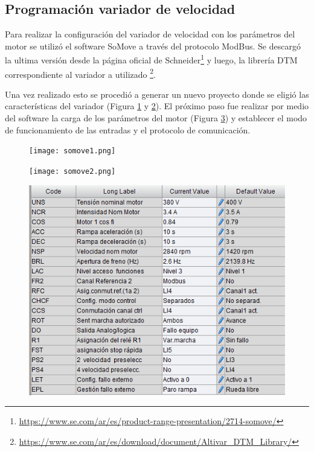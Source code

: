 
\subsection{Programación variador de velocidad}


Para realizar la configuración del variador de velocidad con los parámetros del motor se utilizó el software SoMove a través del protocolo ModBus. Se descargó la ultima versión desde la página oficial de Schneider\footnote{\url{https://www.se.com/ar/es/product-range-presentation/2714-somove/}} y luego, la librería DTM correspondiente al variador a utilizado \footnote{\url{https://www.se.com/ar/es/download/document/Altivar_DTM_Library/}}.

Una vez realizado esto se procedió a generar un nuevo proyecto donde se eligió las características del variador (Figura \ref{fig:so1} y \ref{fig:so2}). El próximo paso fue realizar por medio del software la carga de los parámetros del motor (Figura \ref{fig:paramsomove}) y establecer el modo de funcionamiento de las entradas y el protocolo de comunicación.
\begin{figure}[h]
	\centering
	\texttt{[image: somove1.png]}
	\label{fig:so1}
\end{figure}
\begin{figure}[H]
	\centering
	\texttt{[image: somove2.png]}
	\label{fig:so2}
\end{figure}

\begin{figure}[H]
	\centering
	\includegraphics[scale=0.45]{images/paramsomove}
	\label{fig:paramsomove}
\end{figure}



